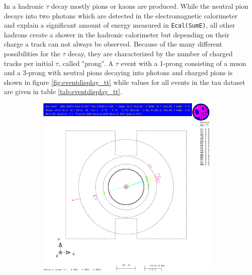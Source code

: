 \documentclass[11pt, a4paper]{article}
\numberwithin{equation}{section}
\begin{document}
In a hadronic $\tau$ decay mostly pions or kaons are produced.
While the neutral pion decays into two photons which are detected in the electromagnetic calorimeter and explain a significant amount of energy measured in \texttt{Ecal(SumE)}, all other hadrons create a shower in the hadronic calorimeter but depending on their charge a track can not always be observed.
Because of the many different possibilities for the $\tau$ decay, they are characterized by the number of charged tracks per initial $\tau$, called "prong".
A $\tau$ event with a 1-prong consisting of a muon and a 3-prong with neutral pions decaying into photons and charged pions is shown in figure \ref{fig:eventdisplay_tt} while values for all events in the tau dataset are given in table \ref{tab:eventdisplay_tt}.
\begin{figure}[h]
	\centering
	\begin{subfigure}{\textwidth}
		\centering
		\includegraphics[width=.9\textwidth]{./data/tag1/tt_pics/cropped/tt_05}
	\end{subfigure}
\end{figure}
\end{document}
